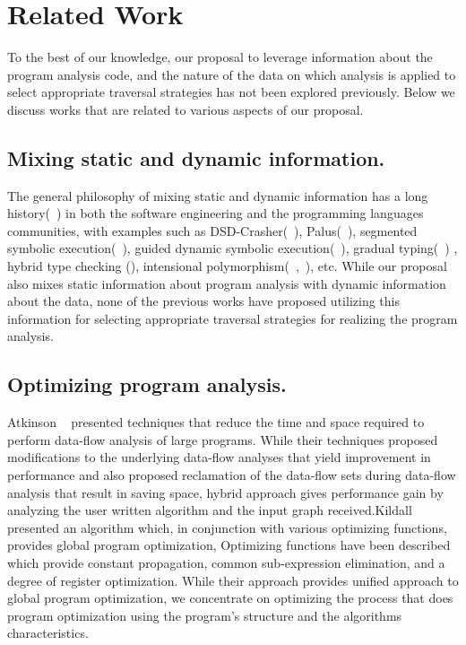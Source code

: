 \chapter{Related Work}
\label{sec:related}

To the best of our knowledge, our proposal to leverage information about the
program analysis code, and the nature of the data on which analysis is applied
to select appropriate traversal strategies has not been explored previously.
Below we discuss works that are related to various aspects of our proposal. 

\section{Mixing static and dynamic information.} %
The general philosophy of mixing static and dynamic information has a long 
history(~\cite{Ernst2003}) in both the software engineering and the programming 
languages communities, with examples such as DSD-Crasher(~\cite{DSD-Crasher}), 
Palus(~\cite{Palus}), segmented symbolic execution(~\cite{Le2013}), guided 
dynamic symbolic execution(~\cite{Christakis2016}), gradual typing(~\cite{Siek07})
, hybrid type checking (\cite{Flanagan06}), intensional polymorphism(~\cite{Harper95},~\cite{ 
Crary98}), etc. While our proposal also mixes static information 
about program analysis with dynamic information about the data, none of the 
previous works have proposed utilizing this information for selecting 
appropriate traversal strategies for realizing the program analysis.

\section{Optimizing program analysis.}%
Atkinson ~\cite{atkinson2001implementation} presented techniques that reduce 
the time and space required to perform data-flow analysis of large programs. 
While their techniques proposed modifications to the underlying data-flow 
analyses that yield improvement in performance and also proposed reclamation 
of the data-flow sets during data-flow analysis that result in saving space, 
hybrid approach gives performance gain by analyzing the user written 
algorithm and the input graph received.\newline Kildall ~\cite{kildall1973unified} 
presented an algorithm which, in conjunction with various optimizing 
functions, provides global program optimization, Optimizing functions have 
been described which provide constant propagation, common sub-expression 
elimination, and a degree of register optimization. While their approach 
provides unified approach to global program optimization, we concentrate on 
optimizing the process that does program optimization using the program's 
structure and the algorithms characteristics.


